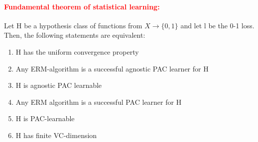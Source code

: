 \documentclass[10pt,a4paper]{article}
\theoremstyle{definition}
\theoremstyle{plain}
\begin{document}
\paragraph{\textcolor{red}{Fundamental theorem of statistical learning:}}
Let H be a hypothesis class of functions from $X \to \{ 0,1 \}$ and let l be the 0-1 loss. Then, the following statements are equivalent:
\begin{enumerate}
	\item H has the uniform convergence property
	\item Any ERM-algorithm is a successful agnostic PAC learner for H
	\item H is agnostic PAC learnable
	\item Any ERM algorithm is a successful PAC learner for H
	\item H is PAC-learnable
	\item H has finite VC-dimension
\end{enumerate}
\end{document}
